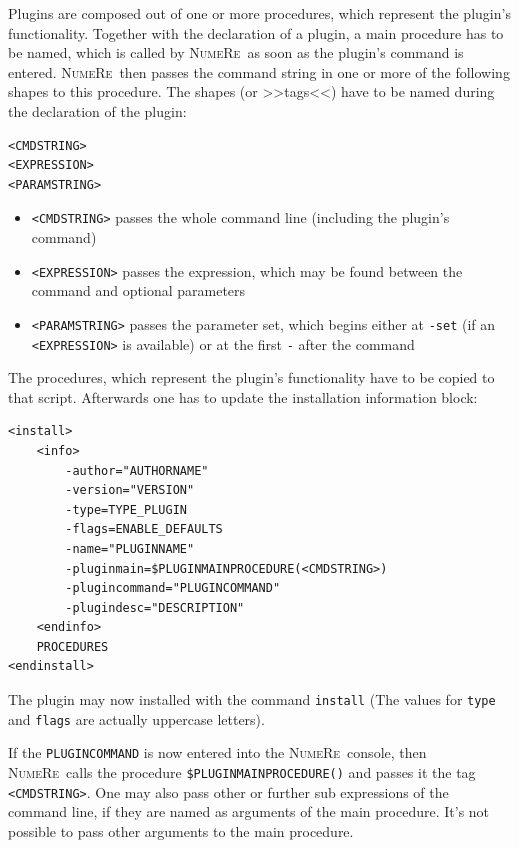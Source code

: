 \documentclass[DIV=14,headsepline,footsepline]{scrbook}
\newcommand{\NR}{\textsc{Nu\-me\-Re}}
\begin{document}
				Plugins are composed out of one or more procedures, which represent the plugin's functionality. Together with the declaration of a plugin, a main procedure has to be named, which is called by \NR\ as soon as the plugin's command is entered. \NR\ then passes the command string in one or more of the following shapes to this procedure. The shapes (or >>tags<<) have to be named during the declaration of the plugin:
				\begin{lstlisting}
<CMDSTRING>
<EXPRESSION>
<PARAMSTRING>
				\end{lstlisting}
				\begin{itemize}
					\item \lstinline+<CMDSTRING>+ passes the whole command line (including the plugin's command)
					\item \lstinline+<EXPRESSION>+ passes the expression, which may be found between the command and optional parameters
					\item \lstinline+<PARAMSTRING>+ passes the parameter set, which begins either at \lstinline+-set+ (if an \lstinline+<EXPRESSION>+ is available) or at the first \lstinline+-+ after the command
				\end{itemize}
				
				The procedures, which represent the plugin's functionality have to be copied to that script. Afterwards one has to update the installation information block:
				\begin{lstlisting}
<install>
	<info>
		-author="AUTHORNAME"
		-version="VERSION"
		-type=TYPE_PLUGIN
		-flags=ENABLE_DEFAULTS
		-name="PLUGINNAME"
		-pluginmain=$PLUGINMAINPROCEDURE(<CMDSTRING>)
		-plugincommand="PLUGINCOMMAND"
		-plugindesc="DESCRIPTION"
	<endinfo>
	PROCEDURES
<endinstall>
				\end{lstlisting}
				The plugin may now installed with the command \lstinline+install+ (The values for \lstinline+type+ and \lstinline+flags+ are actually uppercase letters).
				
				If the \lstinline+PLUGINCOMMAND+ is now entered into the \NR\ console, then \NR\ calls the procedure \lstinline+$PLUGINMAINPROCEDURE()+ and passes it the tag \lstinline+<CMDSTRING>+. One may also pass other or further sub expressions of the command line, if they are named as arguments of the main procedure. It's not possible to pass other arguments to the main procedure.
				
\end{document}
